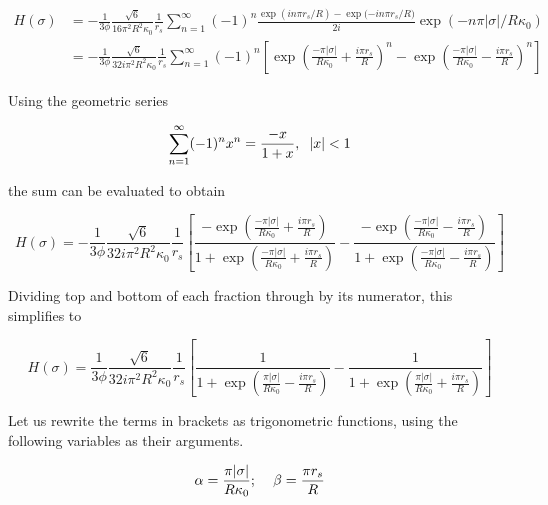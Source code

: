 \documentclass[onecolumn]{aastex63}
\begin{document}
\begin{equation}
    \begin{split}
        H(\sigma) &= - \frac{1}{3 \phi} \frac{\sqrt{6}}{16 \pi^2 R^2 \kappa_0} \frac{1}{r_s} \sum_{n=1}^{\infty} (-1)^n \frac{\exp{(in\pi r_s / R)}-\exp{(-in\pi r_s/R})}{2i} \exp{(-n \pi |\sigma|/R\kappa_0)} \\
        &= - \frac{1}{3 \phi} \frac{\sqrt{6}}{32 i \pi^2 R^2 \kappa_0} \frac{1}{r_s} \sum_{n=1}^{\infty} (-1)^n \left[ \exp{\left(\frac{-\pi |\sigma|}{R\kappa_0} + \frac{i\pi r_s}{R}\right)^n}-\exp{\left(\frac{-\pi |\sigma|}{R\kappa_0} - \frac{i\pi r_s}{R}\right)^n}\right]
    \end{split}
\end{equation}

Using the geometric series

\begin{equation}
    \sum_{n=1}^{\infty}(-1)^nx^n = \frac{-x}{1+x}, \hspace{0.2cm} |x| < 1
\end{equation}

the sum can be evaluated to obtain

\begin{equation}
    H(\sigma) = - \frac{1}{3 \phi} \frac{\sqrt{6}}{32 i \pi^2 R^2 \kappa_0} \frac{1}{r_s} \left[\frac{-\exp{\left(\frac{-\pi |\sigma|}{R\kappa_0} + \frac{i\pi r_s}{R}\right)}}{1 + \exp{\left(\frac{-\pi |\sigma|}{R\kappa_0} + \frac{i\pi r_s}{R}\right)}}-\frac{-\exp{\left(\frac{-\pi |\sigma|}{R\kappa_0} - \frac{i\pi r_s}{R}\right)}}{1 + \exp{\left(\frac{-\pi |\sigma|}{R\kappa_0} - \frac{i\pi r_s}{R}\right)}}\right]
\end{equation}

Dividing top and bottom of each fraction through by its numerator, this simplifies to

\begin{equation} \label{before_trig}
    H(\sigma) = \frac{1}{3 \phi} \frac{\sqrt{6}}{32 i \pi^2 R^2 \kappa_0} \frac{1}{r_s} \left[\frac{1}{1 + \exp{\left(\frac{\pi |\sigma|}{R\kappa_0} - \frac{i\pi r_s}{R}\right)}}-\frac{1}{1 + \exp{\left(\frac{\pi |\sigma|}{R\kappa_0} + \frac{i\pi r_s}{R}\right)}}\right]
\end{equation}

Let us rewrite the terms in brackets as trigonometric functions, using the following variables as their arguments.

\begin{equation}
    \alpha = \frac{\pi |\sigma|}{R\kappa_0}; \hspace{0.4cm} \beta = \frac{\pi r_s}{R}
\end{equation}
\end{document}
